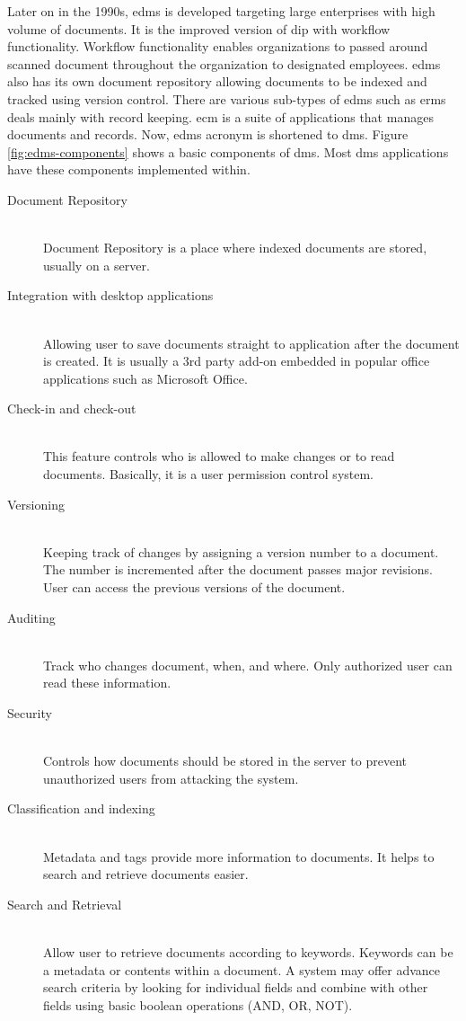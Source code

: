 Later on in the 1990s, \gls{edms} is developed targeting large enterprises with high volume of documents.
It is the improved version of \gls{dip} with workflow functionality.
Workflow functionality enables organizations to passed around scanned document throughout the organization to designated employees.
\gls{edms} also has its own document repository allowing documents to be indexed and tracked using version control.
There are various sub-types of \gls{edms} such as \gls{erms} deals mainly with record keeping.
\gls{ecm} is a suite of applications that manages documents and records.
Now, \gls{edms} acronym is shortened to \gls{dms}.
Figure \ref{fig:edms-components} shows a basic components of \gls{dms}.
Most \gls{dms} applications have these components implemented within.
\begin{description}
	\item[Document Repository] \hfill \\
	Document Repository is a place where indexed documents are stored, usually on a server.
	\item[Integration with desktop applications] \hfill \\
	Allowing user to save documents straight to application after the document is created.
	It is usually a 3rd party add-on embedded in popular office applications such as Microsoft Office.
	\item[Check-in and check-out] \hfill \\
	This feature controls who is allowed to make changes or to read documents.
	Basically, it is a user permission control system.
	\item[Versioning] \hfill \\
	Keeping track of changes by assigning a version number to a document.
	The number is incremented after the document passes major revisions.
	User can access the previous versions of the document.
	\item[Auditing] \hfill \\
	Track who changes document, when, and where.
	Only authorized user can read these information.
	\item[Security] \hfill \\
	Controls how documents should be stored in the server to prevent unauthorized users from attacking the system.
	\item[Classification and indexing] \hfill \\
	Metadata and tags provide more information to documents.
	It helps to search and retrieve documents easier.
	\item[Search and Retrieval] \hfill \\
	Allow user to retrieve documents according to keywords.
	Keywords can be a metadata or contents within a document.
	A system may offer advance search criteria by looking for individual fields and combine with other fields using basic boolean operations (AND, OR, NOT). 
\end{description}

